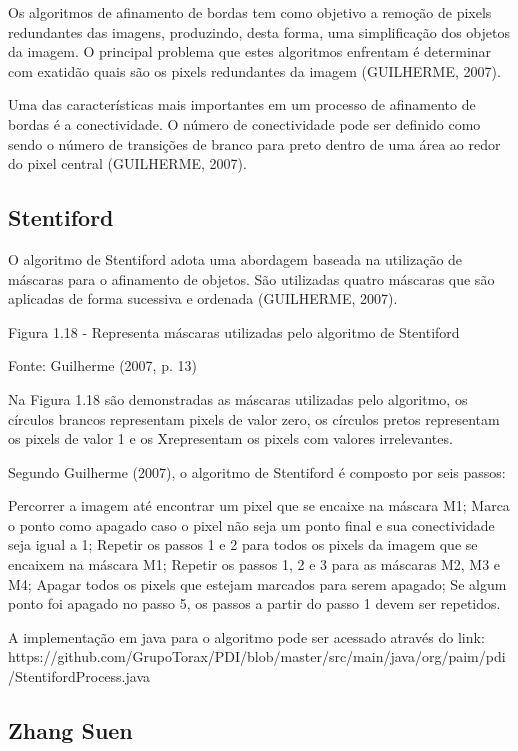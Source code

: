 \documentclass[
	12pt,				%
	oneside,			%
	a4paper,			%
	english,			%
	french,				%
	spanish,			%
	brazil,				%
	]{abntex2}
\begin{document}
Os algoritmos de afinamento de bordas tem como objetivo a remoção de pixels redundantes das imagens, produzindo, desta forma, uma simplificação dos objetos da imagem. O principal problema que estes algoritmos enfrentam é determinar com exatidão quais são os pixels redundantes da imagem (GUILHERME, 2007).

Uma das características mais importantes em um processo de afinamento de bordas é a conectividade. O número de conectividade pode ser definido como sendo o número de transições de branco para preto dentro de uma área ao redor do pixel central (GUILHERME, 2007).
    
\subsection{Stentiford}    

O algoritmo de Stentiford adota uma abordagem baseada na utilização de máscaras para o afinamento de objetos. São utilizadas quatro máscaras que são aplicadas de forma sucessiva e ordenada (GUILHERME, 2007).

Figura 1.18 - Representa máscaras utilizadas pelo algoritmo de Stentiford

Fonte: Guilherme (2007, p. 13)

Na Figura 1.18 são demonstradas as máscaras utilizadas pelo algoritmo, os círculos brancos representam pixels de valor zero, os círculos pretos representam os pixels de valor 1 e os Xrepresentam os pixels com valores irrelevantes.

Segundo Guilherme (2007), o algoritmo de Stentiford é composto por seis passos:

Percorrer a imagem até encontrar um pixel que se encaixe na máscara M1;
Marca o ponto como apagado caso o pixel não seja um ponto final e sua conectividade seja igual a 1;
Repetir os passos 1 e 2 para todos os pixels da imagem que se encaixem na máscara M1;
Repetir os passos 1, 2 e 3 para as máscaras M2, M3 e M4;
Apagar todos os pixels que estejam marcados para serem apagado;
Se algum ponto foi apagado no passo 5, os passos a partir do passo 1 devem ser repetidos.

A implementação em java para o algoritmo pode ser acessado através do link:
https://github.com/GrupoTorax/PDI/blob/master/src/main/java/org/paim/pdi/StentifordProcess.java

\subsection{Zhang Suen}
\end{document}
